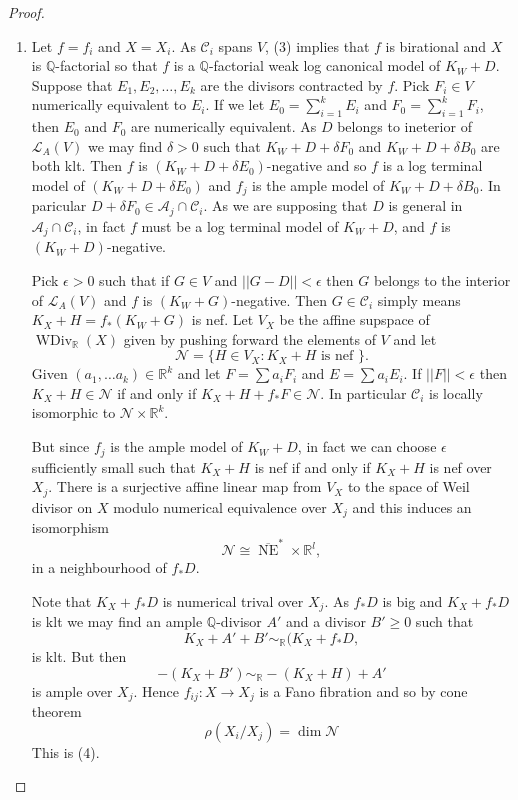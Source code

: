 \documentclass{article}
\begin{document}
\begin{proof}
\begin{enumerate}[1)]
  \item Let $f=f_{i}$ and $X=X_{i}$. As $\mathcal{C}_{i}$ spans $V$, (3) implies that $f$ is birational and $X$ is $\mathbb{Q}$-factorial so that $f$ is a $\mathbb{Q}$-factorial weak log canonical model of $K_{W}+D$. Suppose that $E_{1},E_{2},\ldots ,E_{k}$ are the divisors contracted by $f$.  Pick $F_{i} \in V$ numerically equivalent to $E_{i}$. If we let $E_{0}= \sum^{k}_{i=1} E_{i}$ and $F_{0}= \sum^{k}_{i=1}F_{i} $, then $E_{0}$ and $F_{0}$ are numerically equivalent. As $D$ belongs to ineterior of $\mathcal{L}_{A}(V)$ we may find $\delta>0$ such that $K_{W}+D+\delta F_{0}$ and $K_{W}+D+\delta B_{0}$ are both klt. Then $f$ is $(K_{W}+D+  \delta E_{0})$-negative and so $f$ is a log terminal model of $(K_{W}+D+  \delta E_{0})$ and $f_{j} $ is the ample model of $K_{W}+D+\delta B_{0}$. In paricular  $D+\delta F_{0} \in \mathcal{A}_{j} \cap \mathcal{C}_{i}$. As we are supposing that $D$ is general in $\mathcal{A}_{j} \cap  \mathcal{C}_{i}$, in fact $f$ must be a log terminal model of $K_{W}+D$, and $f$ is $(K_{W}+D)$-negative.    

    Pick $\epsilon>0 $ such that if $G \in V$ and $||G-D||< \epsilon$ then $G$ belongs to the interior of $\mathcal{L}_{A}(V)$ and $f$ is $(K_{W}+G)$-negative. Then $G \in \mathcal{C}_{i}$ simply means  $K_{X}+H=f_*(K_{W}+G)$ is nef. Let $V_{X}$ be the affine supspace of $\operatorname{WDiv}_{\mathbb{R}}(X)$ given by pushing forward the elements of $V$ and let 
    \[
      \mathcal{N}= \{H \in V_{X}: K_X +H \text{ is nef }\} 
   . \]
  Given $(a_{1},\ldots a_{k})\in \mathbb{R}^k$ and let $F =\sum a_{i}F_{i}$ and $E=\sum a_{i}E_{i}$. If $||F||<\epsilon$ then $K_{X}+H \in \mathcal{N}$ if and only if $K_{X}+H+f_*F \in \mathcal{N}$. In particular $\mathcal{C}_{i}$ is locally isomorphic to $\mathcal{N} \times \mathbb{R}^k$.

  But since $f_{j}$ is the ample model of $K_{W}+D$, in fact we can choose $\epsilon$ sufficiently small such that $K_{X}+H$ is nef if and only if $K_{X}+H$ is nef over $X_j$. There is a surjective  affine linear map from $V_{X}$ to the space of Weil divisor on $X$ modulo numerical equivalence over $X_{j}$ and this induces an isomorphism
  \[
    \mathcal{N} \cong \overline{\operatorname{NE}}^* \times \mathbb{R}^l,
  \]
 in a neighbourhood of $f_*D$.

 Note that $K_{X}+f_* D$ is numerical trival over $X_{j}$. As $f_*D$ is big and $K_{X}+f_*D$ is klt we may find an ample $\mathbb{Q}$-divisor $A'$ and a divisor $B'\geqslant 0$ such that 
 \[
   K_{X}+A'+B' \sim_{\mathbb{R}} (K_{X}+f_*D 
 ,\]
is klt. But then 
\[
  -(K_{X}+B')\sim_{\mathbb{R}}-(K_{X}+H)+A'
\]
is ample over $X_{j}$. Hence $f_{ij}:X\to X_{j}$ is a Fano fibration and so by cone theorem 
\[
  \rho(X_{i}/X_{j})=\dim \mathcal{N}
\]
This is (4).
  \end{enumerate}
\end{proof}
\end{document}
